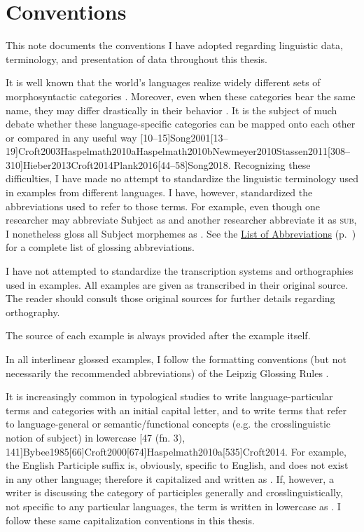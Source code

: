 \chapter{Conventions}
\label{ch:conventions}

This note documents the conventions I have adopted regarding linguistic data, terminology, and presentation of data throughout this thesis.


It is well known that the world's languages realize widely different sets of morphosyntactic categories . Moreover, even when these categories bear the same name, they may differ drastically in their behavior \citep[9]{Dixon2010}. It is the subject of much debate whether these language-specific categories can be mapped onto each other or compared in any useful way [10--15]{Song2001}[13--19]{Croft2003}{Haspelmath2010a}{Haspelmath2010b}{Newmeyer2010}{Stassen2011}[308--310]{Hieber2013}{Croft2014}{Plank2016}[44--58]{Song2018}. Recognizing these difficulties, I have made no attempt to standardize the linguistic terminology used in examples from different languages. I have, however, standardized the abbreviations used to refer to those terms. For example, even though one researcher may abbreviate Subject as  and another researcher abbreviate it as \textsc{sub}, I nonetheless gloss all Subject morphemes as . See the \hyperref[ch:abbreviations]{List of Abbreviations} (p.~\pageref{ch:abbreviations}) for a complete list of glossing abbreviations.

I have not attempted to standardize the transcription systems and orthographies used in examples. All examples are given as transcribed in their original source. The reader should consult those original sources for further details regarding orthography.

The source of each example is always provided after the example itself.

In all interlinear glossed examples, I follow the formatting conventions (but not necessarily the recommended abbreviations) of the Leipzig Glossing Rules \citep{BickelComrieHaspelmath2015}.


It is increasingly common in typological studies to write language-particular terms and categories with an initial capital letter, and to write terms that refer to language-general or semantic/functional concepts (e.g. the crosslinguistic notion of subject) in lowercase [47 (fn. 3), 141]{Bybee1985}[66]{Croft2000}[674]{Haspelmath2010a}[535]{Croft2014}. For example, the English Participle suffix  is, obviously, specific to English, and does not exist in any other language; therefore it capitalized and written as . If, however, a writer is discussing the category of participles generally and crosslinguistically, not specific to any particular languages, the term is written in lowercase as . I follow these same capitalization conventions in this thesis.

